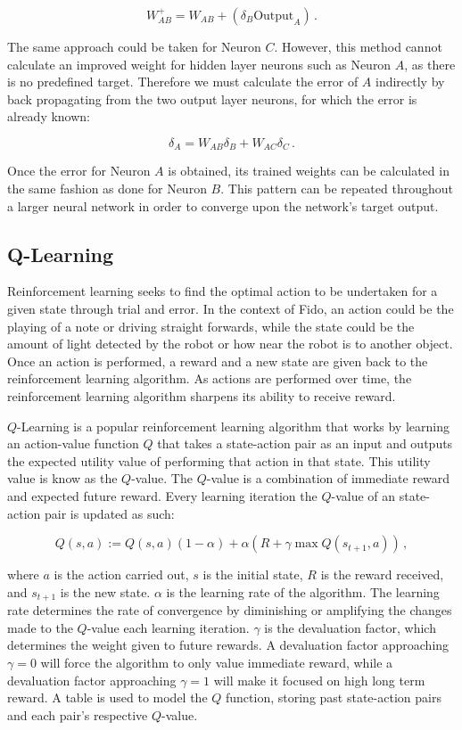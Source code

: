 \begin{equation}
	W_{AB}^{+} = W_{AB} + (\delta_B \text{Output}_A)\,.
\end{equation}

The same approach could be taken for Neuron $C$.
However, this method cannot calculate an improved weight for hidden layer neurons such as Neuron $A$, as there is no predefined target.
Therefore we must calculate the error of $A$ indirectly by back propagating from the two output layer neurons, for which the error is already known:

\begin{equation}
	\delta_A = W_{AB}\delta_B + W_{AC}\delta_C \,.
\end{equation}

Once the error for Neuron $A$ is obtained, its trained weights can be calculated in the same fashion as done for Neuron $B$.
This pattern can be repeated throughout a larger neural network in order to converge upon the network's target output.

\subsection{Q-Learning}

Reinforcement learning seeks to find the optimal action to be undertaken for a given state through trial and error.
In the context of Fido, an action could be the playing of a note or driving straight forwards, while the state could be the amount of light detected by the robot or how near the robot is to another object.
Once an action is performed, a reward and a new state are given back to the reinforcement learning algorithm.
As actions are performed over time, the reinforcement learning algorithm sharpens its ability to receive reward.

$Q$-Learning \cite{watkins} is a popular reinforcement learning algorithm that works by learning an action-value function $Q$ that takes a state-action pair as an input and outputs the expected utility value of performing that action in that state.
This utility value is know as the $Q$-value.
The $Q$-value is a combination of immediate reward and expected future reward.
Every learning iteration the $Q$-value of an state-action pair is updated as such:

\begin{equation}
	Q(s, a) := Q(s, a)(1 - \alpha) + \alpha(R + \gamma \max Q(s_{t+1}, a))
	\,,
	\label{equ::updateqlearn}
\end{equation}

\noindent
where $a$ is the action carried out, $s$ is the initial state, $R$ is the reward received, and $s_{t+1}$ is the new state.
$\alpha$ is the learning rate of the algorithm.
The learning rate determines the rate of convergence by diminishing or amplifying the changes made to the $Q$-value each learning iteration.
$\gamma$ is the devaluation factor, which determines the weight given to future rewards.
A devaluation factor approaching $\gamma=0$ will force the algorithm to only value immediate reward, while a devaluation factor approaching $\gamma=1$ will make it focused on high long term reward.
A table is used to model the $Q$ function, storing past state-action pairs and each pair's respective $Q$-value.

